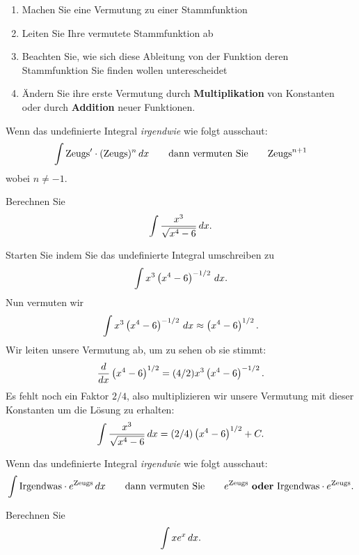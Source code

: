 \begin{guessingAntiderivatives}\hfil
\begin{enumerate}
\item Machen Sie eine Vermutung zu einer Stammfunktion
\item Leiten Sie Ihre vermutete Stammfunktion ab
\item Beachten Sie, wie sich diese Ableitung von der Funktion deren Stammfunktion Sie finden wollen unterescheidet
\item Ändern Sie ihre erste Vermutung durch \textbf{Multiplikation} von Konstanten
  oder durch \textbf{Addition} neuer Funktionen.
\end{enumerate}
\end{guessingAntiderivatives}

\begin{template}\label{template:powerchain}
Wenn das undefinierte Integral \emph{irgendwie} wie folgt ausschaut:
\[
\int \mathrm{Zeugs}' \cdot (\mathrm{Zeugs})^n \, d x \qquad\text{dann vermuten Sie} \qquad \mathrm{Zeugs}^{n+1}
\]
wobei $n\ne -1$.
\end{template}

\begin{example} Berechnen Sie
\[
\int \frac{x^3}{\sqrt{x^4 -6}} \, d x.
\]
\end{example}

\begin{solution}
Starten Sie indem Sie das undefinierte Integral umschreiben zu
\[
\int x^3\left(x^4 -6\right)^{-1/2} \, d x.
\]
Nun vermuten wir
\[
\int x^3\left(x^4 -6\right)^{-1/2} \, d x \approx \left(x^4 -6\right)^{1/2}.
\]
Wir leiten unsere Vermutung ab, um zu sehen ob sie stimmt:
\[
\frac{d}{dx}  \left(x^4 -6\right)^{1/2} = (4/2)x^3\left(x^4 -6\right)^{-1/2}.
\]
Es fehlt noch ein Faktor $2/4$, also multiplizieren wir unsere Vermutung mit dieser Konstanten um die Lösung zu erhalten:
\[
\int \frac{x^3}{\sqrt{x^4 -6}} \, d x = (2/4)\left(x^4 -6\right)^{1/2}+C.
\]
\end{solution}


\begin{template}\label{template:echain}
Wenn das undefinierte Integral \emph{irgendwie} wie folgt ausschaut:
\[
\int \mathrm{Irgendwas}\cdot e^{\mathrm{Zeugs}} \, d x \qquad\text{dann vermuten Sie}\qquad e^{\mathrm{Zeugs}} \text{ \textbf{oder} }\mathrm{Irgendwas}
\cdot e^{\mathrm{Zeugs}}.
\]
\end{template}


\begin{example}
Berechnen Sie
\[
\int xe^{x} \, d x.
\]
\end{example}


